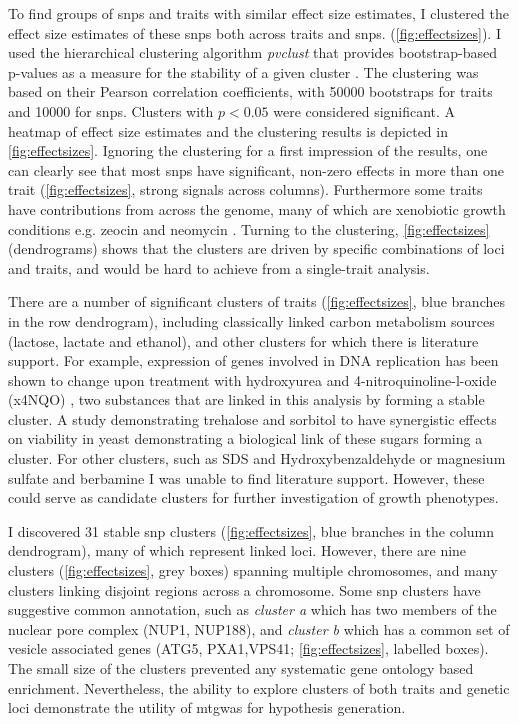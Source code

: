 To find groups of \glspl{snp} and traits with similar effect size estimates, I clustered the effect size estimates of these \glspl{snp} both across traits and \glspl{snp}. (\cref{fig:effectsizes}). I used the hierarchical clustering algorithm \textit{pvclust} that provides bootstrap-based p-values as a measure for the stability of a given cluster \citep{Suzuki2006}. The clustering was based on their Pearson correlation coefficients, with \num{50000} bootstraps for traits and \num{10000} for \glspl{snp}. Clusters with \(p < 0.05\) were considered significant. A heatmap of effect size estimates and the clustering results is depicted in \cref{fig:effectsizes}. Ignoring the clustering for a first impression of the results, one can clearly see that most \glspl{snp} have significant, non-zero effects in more than one trait (\cref{fig:effectsizes}, strong signals across columns). Furthermore some traits have contributions from across the genome, many of which are xenobiotic growth conditions e.g. zeocin \citep{Krol2015} and neomycin \citep{Foiani2010}. Turning to the clustering, \cref{fig:effectsizes} (dendrograms) shows that the clusters are driven by specific combinations of loci and traits, and would be hard to achieve from a single-trait analysis. 

There are a number of significant clusters of traits (\cref{fig:effectsizes}, blue branches in the row dendrogram), including classically linked carbon metabolism sources (lactose, lactate and ethanol), and other clusters for which there is literature support. For example, expression of genes involved in DNA replication has been shown to change upon treatment with hydroxyurea and \num{4}-nitroquinoline-l-oxide (x4NQO) \citep{Elledge1990}, two substances that are linked in this analysis by forming a stable cluster. A study demonstrating trehalose and sorbitol to have synergistic effects on viability in yeast \citep{Hua2015} demonstrating a biological link of these sugars forming a cluster. For other clusters, such as SDS and Hydroxybenzaldehyde or magnesium sulfate and berbamine I was unable to find literature support. However, these could serve as candidate clusters for further investigation of growth phenotypes.

I discovered \num{31} stable \gls{snp} clusters (\cref{fig:effectsizes}, blue branches in the column dendrogram), many of which represent linked loci. However, there are nine clusters (\cref{fig:effectsizes}, grey boxes) spanning multiple chromosomes, and many clusters linking disjoint regions across a chromosome. Some \gls{snp} clusters have suggestive common annotation, such as \textit{cluster a} which has two members of the nuclear pore complex (NUP1, NUP188), and \textit{cluster b} which has a common set of vesicle associated genes (ATG5, PXA1,VPS41; \cref{fig:effectsizes}, labelled boxes). The small size of the clusters prevented any systematic gene ontology based enrichment. Nevertheless, the ability to explore clusters of both traits and genetic loci demonstrate the utility of \gls{mtgwas} for hypothesis generation.

